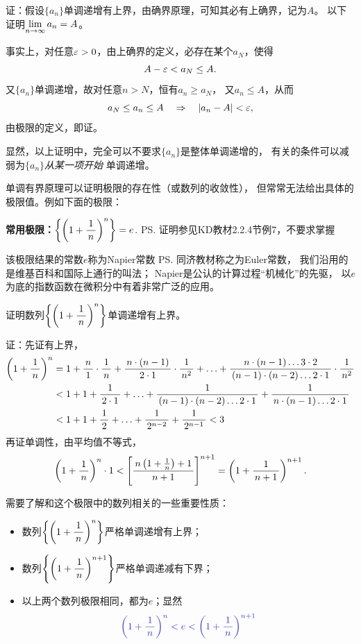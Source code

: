 证：假设$\{a_n\}$单调递增有上界，由确界原理，可知其必有上确界，记为$A$。
以下证明$\lim\limits_{n\to\infty} a_n=A$。

事实上，对任意$\varepsilon>0$，由上确界的定义，必存在某个$a_N$，使得
$$A-\varepsilon<a_N\leq A.$$
又$\{a_n\}$单调递增，故对任意$n>N$，恒有$a_n\geq a_N$，
又$a_n\leq A$，从而
$$a_N\leq a_n\leq A\quad\Rightarrow\quad |a_n-A|<\varepsilon,$$
由极限的定义，即证。\fin

显然，以上证明中，完全可以不要求$\{a_n\}$是整体单调递增的，
有关的条件可以减弱为$\{a_n\}${\it 从某一项开始}
单调递增。

单调有界原理可以证明极限的存在性（或数列的收敛性），
但常常无法给出具体的极限值。例如下面的极限：

\begin{thx}
	{\bf 常用极限：}$\left\{\left(1+\displaystyle\frac{\,{1}\,}{\,{n}\,}\right)^n\right\}=e$.
	\ps{证明参见KD教材2.2.4节例7，不要求掌握}
\end{thx}

该极限结果的常数$e$称为{\kaishu Napier常数}
\ps{同济教材称之为Euler常数，
我们沿用的是维基百科和国际上通行的叫法；
Napier是公认的计算过程“机械化”的先驱}，
以$e$为底的指数函数在微积分中有着非常广泛的应用。

\begin{shaded}
\egz 证明数列$\left\{\left(1+\displaystyle\frac{\,{1}\,}{\,{n}\,}\right)^n\right\}$单调递增有上界。

证：先证有上界，
\begin{align}
	\left(1+\displaystyle\frac{\,{1}\,}{\,{n}\,}\right)^n&=1+\displaystyle\frac{\,{n}\,}{\,{1}\,}\cdot\displaystyle\frac{\,{1}\,}{\,{n}\,}
	+\displaystyle\frac{\,{n\cdot(n-1)}\,}{\,{2\cdot1}\,}\cdot\displaystyle\frac{\,{1}\,}{\,{n^2}\,}+\ldots
	+\displaystyle\frac{\,{n\cdot(n-1)\ldots3\cdot2}\,}{\,{(n-1)\cdot(n-2)\ldots2\cdot1}\,}\cdot\displaystyle\frac{\,{1}\,}{\,{n^2}\,}\notag\\
	&<1+1+\displaystyle\frac{\,{1}\,}{\,{2\cdot1}\,}+\ldots+\displaystyle\frac{\,{1}\,}{\,{(n-1)\cdot(n-2)\ldots2\cdot1}\,}
	+\displaystyle\frac{\,{1}\,}{\,{n\cdot(n-1)\ldots2\cdot1}\,}\notag\\
	&<1+1+\displaystyle\frac{\,{1}\,}{\,{2}\,}+\ldots+\displaystyle\frac{\,{1}\,}{\,{2^{n-2}}\,}+\displaystyle\frac{\,{1}\,}{\,{2^{n-1}}\,}<3\notag
\end{align}
再证单调性，由平均值不等式，
$$\left(1+\displaystyle\frac{\,{1}\,}{\,{n}\,}\right)^n\cdot 1<
\left[\displaystyle\frac{\,{n\left(1+\frac1n\right)+1}\,}{\,{n+1}\,}\right]^{n+1}
=\left(1+\displaystyle\frac{\,{1}\,}{\,{n+1}\,}\right)^{n+1}.$$
\fin
\end{shaded}

需要了解和这个极限中的数列相关的一些重要性质：
\begin{itemize}
  \setlength{\itemindent}{1cm}
  \item 数列$\left\{\left(1+\displaystyle\frac{\,{1}\,}{\,{n}\,}\right)^n\right\}$严格单调递增有上界；
  \item 数列$\left\{\left(1+\displaystyle\frac{\,{1}\,}{\,{n}\,}\right)^{n+1}\right\}$严格单调递减有下界；
  \item 以上两个数列极限相同，都为$e$；显然
  $$\b\left(1+\df1n\right)^n<e<\left(1+\df1n\right)^{n+1}$$
\end{itemize}

